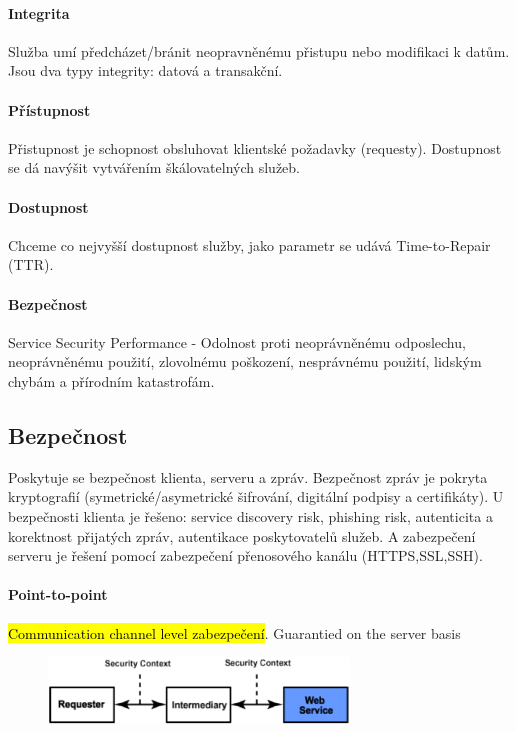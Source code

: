 \paragraph{Integrita}
Služba umí předcházet/bránit neopravněnému přistupu nebo modifikaci k datům. Jsou dva typy integrity: datová a transakční.

\paragraph{Přístupnost}
Přistupnost je schopnost obsluhovat klientské požadavky (requesty). Dostupnost se dá navýšit vytvářením škálovatelných služeb.

\paragraph{Dostupnost}
Chceme co nejvyšší dostupnost služby, jako parametr se udává Time-to-Repair (TTR).

\paragraph{Bezpečnost}
Service Security Performance - Odolnost proti neoprávněnému odposlechu, neoprávněnému použití, zlovolnému poškození, nesprávnému použití, lidským chybám a přírodním katastrofám.

\subsection{Bezpečnost}
Poskytuje se bezpečnost klienta, serveru a zpráv. Bezpečnost zpráv je pokryta kryptografií (symetrické/asymetrické šifrování, digitální podpisy a certifikáty). U bezpečnosti klienta je řešeno: service discovery risk, phishing risk, autenticita a korektnost přijatých zpráv, autentikace poskytovatelů služeb. A zabezpečení serveru je řešení pomocí zabezpečení přenosového kanálu (HTTPS,SSL,SSH).


\paragraph{Point-to-point}
\hl{Communication channel level zabezpečení}. Guarantied on the server basis
\begin{figure}[h!]
\centering
\includegraphics[width=80mm]{12/images/security-p2p}
\end{figure}

